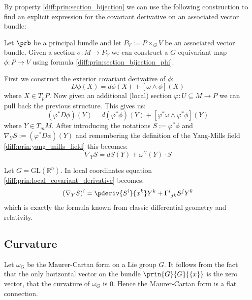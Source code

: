 	By property \ref{diff:prin:section_bijection} we can use the following construction to find an explicit expression for the covariant derivative on an associated vector bundle:
	\begin{construct}
		Let $\prb$ be a principal bundle and let $P_V := P\times_G V$ be an associated vector bundle. Given a section $\sigma:M\rightarrow P_V$ we can construct a $G$-equivariant map $\phi:P\rightarrow V$ using formula \ref{diff:prin:section_bijection_phi}.
		
		First we construct the exterior covariant derivative of $\phi$:
		\begin{equation}
			D\phi(X) = d\phi(X) + [\omega\wedge\phi](X)
		\end{equation}
		where $X\in T_pP$. Now given an additional (local) section $\varphi:U\subseteq M\rightarrow P$ we can pull back the previous structure. This gives us:
		\begin{equation}
			(\varphi^*D\phi)(Y) = d(\varphi^*\phi)(Y) + [\varphi^*\omega\wedge\varphi^*\phi](Y)
		\end{equation}
		where $Y\in T_mM$. After introducing the notations $S:=\varphi^*\phi$ and $\nabla_YS:=(\varphi^*D\phi)(Y)$ and remembering the definition of the Yang-Mills field \ref{diff:prin:yang_mills_field} this becomes:
		\begin{equation}
			\label{diff:prin:local_covariant_derivative}
			\boxed{\nabla_YS = dS(Y) + \omega^U(Y)\cdot S}
		\end{equation}
	\end{construct}
	\begin{example}
		Let $G=\text{GL}(\mathbb{R}^n)$. In local coordinates equation \ref{diff:prin:local_covariant_derivative} becomes:
		\begin{equation}
			(\nabla_YS)^i = \pderiv{S^i}{x^k}Y^k + \Gamma^i_{\ jk}S^jY^k
		\end{equation}
		which is exactly the formula known from classic differential geometry and relativity. 
	\end{example}

\subsection{Curvature}

	\begin{example}
		Let $\omega_G$ be the Maurer-Cartan form on a Lie group $G$. It follows from the fact that the only horizontal vector on the bundle $\prin{G}{G}{\{x\}}$ is the zero vector, that the curvature of $\omega_G$ is 0. Hence the Maurer-Cartan form is a flat connection.
	\end{example}
	
